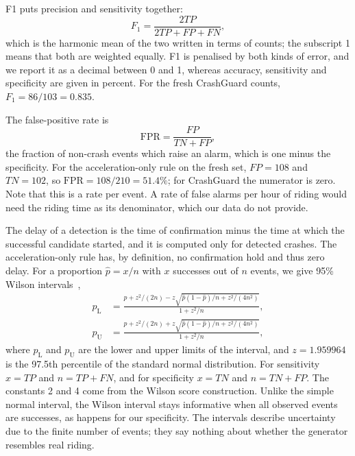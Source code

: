 \documentclass[10pt,a4paper]{article}
\begin{document}
F1 puts precision and sensitivity together:
\begin{equation}\label{eq:f1} F_1=\frac{2TP}{2TP+FP+FN},\end{equation}
which is the harmonic mean of the two written in terms of counts; the subscript 1 means that both are weighted equally. F1 is penalised by both kinds of error, and we report it as a decimal between 0 and 1, whereas accuracy, sensitivity and specificity are given in percent. For the fresh CrashGuard counts, $F_1=86/103=0.835$.

The false-positive rate is
\begin{equation}\label{eq:fpr} \mathrm{FPR}=\frac{FP}{TN+FP},\end{equation}
the fraction of non-crash events which raise an alarm, which is one minus the specificity. For the acceleration-only rule on the fresh set, $FP=108$ and $TN=102$, so $\mathrm{FPR}=108/210=51.4\%$; for CrashGuard the numerator is zero. Note that this is a rate per event. A rate of false alarms per hour of riding would need the riding time as its denominator, which our data do not provide.

The delay of a detection is the time of confirmation minus the time at which the successful candidate started, and it is computed only for detected crashes. The acceleration-only rule has, by definition, no confirmation hold and thus zero delay. For a proportion $\hat p=x/n$ with $x$ successes out of $n$ events, we give 95\% Wilson intervals~\cite{wilson1927interval},
\begin{equation}\label{eq:wilson}
\begin{aligned}
p_{\mathrm L}&=\frac{\hat p+z^2/(2n)-z\sqrt{\hat p(1-\hat p)/n+z^2/(4n^2)}}{1+z^2/n},\\[2mm]
p_{\mathrm U}&=\frac{\hat p+z^2/(2n)+z\sqrt{\hat p(1-\hat p)/n+z^2/(4n^2)}}{1+z^2/n},
\end{aligned}
\end{equation}
where $p_{\mathrm L}$ and $p_{\mathrm U}$ are the lower and upper limits of the interval, and $z=1.959964$ is the 97.5th percentile of the standard normal distribution. For sensitivity $x=TP$ and $n=TP+FN$, and for specificity $x=TN$ and $n=TN+FP$. The constants 2 and 4 come from the Wilson score construction. Unlike the simple normal interval, the Wilson interval stays informative when all observed events are successes, as happens for our specificity. The intervals describe uncertainty due to the finite number of events; they say nothing about whether the generator resembles real riding.
\end{document}
